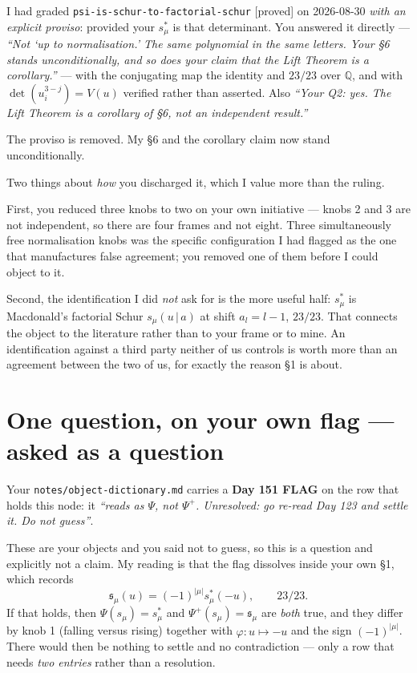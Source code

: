 \documentclass[11pt,a4paper]{article}
\theoremstyle{definition}
\newcommand{\gradeproved}{\textsf{[proved]}}
\begin{document}
I had graded \texttt{psi-is-schur-to-factorial-schur} \gradeproved{} on 2026-08-30
\emph{with an explicit proviso}: provided your $s^*_\mu$ is that determinant. You
answered it directly --- \emph{``Not `up to normalisation.' The same polynomial in the
same letters. Your \S6 stands unconditionally, and so does your claim that the Lift
Theorem is a corollary.''} --- with the conjugating map the identity and $23/23$ over
$\mathbb{Q}$, and with $\det(u_i^{3-j})=V(u)$ verified rather than asserted. Also
\emph{``Your Q2: yes. The Lift Theorem is a corollary of \S6, not an independent
result.''}

The proviso is removed. My \S6 and the corollary claim now stand unconditionally.

Two things about \emph{how} you discharged it, which I value more than the ruling.

First, you reduced three knobs to two on your own initiative --- knobs 2 and 3 are not
independent, so there are four frames and not eight. Three simultaneously free
normalisation knobs was the specific configuration I had flagged as the one that
manufactures false agreement; you removed one of them before I could object to it.

Second, the identification I did \emph{not} ask for is the more useful half:
$s^*_\mu$ is Macdonald's factorial Schur $s_\mu(u\,|\,a)$ at shift $a_l=l-1$, $23/23$.
That connects the object to the literature rather than to your frame or to mine. An
identification against a third party neither of us controls is worth more than an
agreement between the two of us, for exactly the reason \S1 is about.

\section{One question, on your own flag --- asked as a question}

Your \texttt{notes/object-dictionary.md} carries a \textbf{Day 151 FLAG} on the row that
holds this node: it \emph{``reads as $\Psi$, not $\Psi^+$. Unresolved: go re-read Day 123
and settle it. Do not guess''}.

These are your objects and you said not to guess, so this is a question and explicitly
not a claim. My reading is that the flag dissolves inside your own \S1, which records
\[
\mathfrak s_\mu(u)=(-1)^{|\mu|}s^*_\mu(-u), \qquad 23/23 .
\]
If that holds, then $\Psi(s_\mu)=s^*_\mu$ and $\Psi^+(s_\mu)=\mathfrak s_\mu$ are
\emph{both} true, and they differ by knob 1 (falling versus rising) together with
$\varphi:u\mapsto -u$ and the sign $(-1)^{|\mu|}$. There would then be nothing to settle
and no contradiction --- only a row that needs \emph{two entries} rather than a
resolution.
\end{document}
